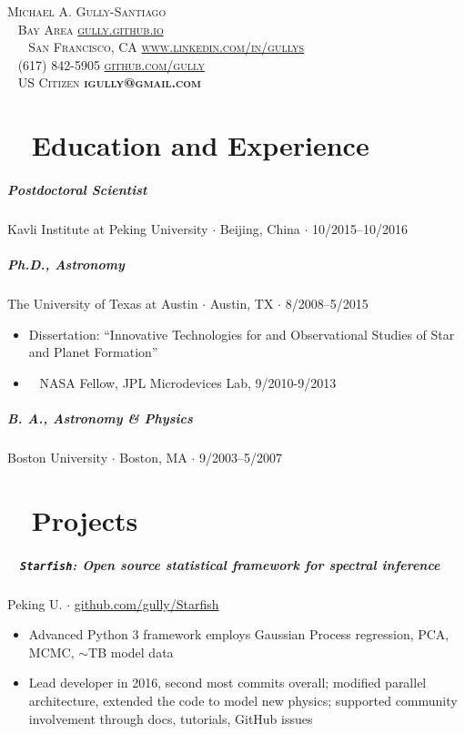 \documentclass[10pt,letterpaper]{article}
\newcommand{\namestyle}{\Huge \scshape}
\newcommand{\addressstyle}{\color{addresscolor}  \footnotesize \sffamily \upshape}
\begin{document}
\begin{flushleft}
    \namestyle Michael A. Gully-Santiago \\[0.3em]
    \addressstyle 
    \faMapMarker ~ Bay Area  \hfill \url{gully.github.io} ~ \faExternalLink \\
    ~ ~ San Francisco, CA  \hfill  \url{www.linkedin.com/in/gullys} ~ \faLinkedin \\
    \faPhone ~ (617) 842-5905 \hfill \url{github.com/gully} ~ \faGithub \\
    \faGlobe ~ US Citizen \hfill \textbf{igully@gmail.com} ~ \faInbox\\

\end{flushleft}

\small

\section*{\faInstitution ~ Education and Experience}

\subparagraph{Postdoctoral Scientist}
Kavli Institute at Peking University $\cdot$ Beijing, China $\cdot$ 10/2015--10/2016

\subparagraph{\textbf{Ph.D}., Astronomy}
The University of Texas at Austin $\cdot$ Austin, TX $\cdot$ 8/2008--5/2015
\begin{itemize}
    \item Dissertation: ``Innovative Technologies for and Observational Studies of Star and Planet Formation''
    \item \faRocket ~ NASA Fellow, JPL Microdevices Lab, 9/2010-9/2013
\end{itemize}

\subparagraph{\textbf{B. A.}, Astronomy \& Physics}
Boston University $\cdot$ Boston, MA $\cdot$ 9/2003--5/2007

\section*{\faLineChart ~ Projects}

\subparagraph{\faCodeFork ~ \texttt{Starfish}: Open source statistical framework for spectral inference}
Peking U. $\cdot$ \href{https://github.com/gully/Starfish}{github.com/gully/Starfish}
\begin{itemize}
    \item Advanced Python 3 framework employs Gaussian Process regression, PCA, MCMC, $\sim$TB model data
    \item Lead developer in 2016, second most commits overall; modified parallel architecture, extended the code to model new physics; supported community involvement through docs, tutorials, GitHub issues
\end{itemize}
\end{document}
